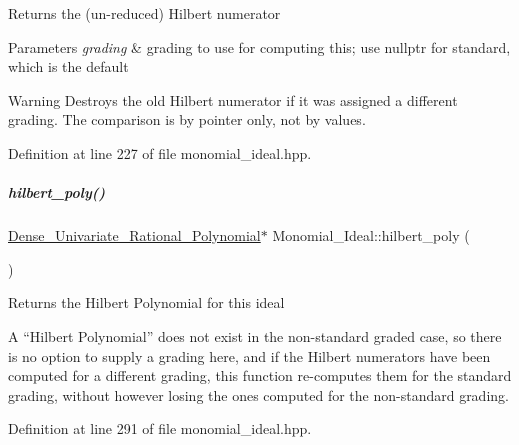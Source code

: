 \begin{DoxyReturn}{Returns}
the (un-\/reduced) Hilbert numerator 
\end{DoxyReturn}

\begin{DoxyParams}{Parameters}
{\em grading} & grading to use for computing this; use {\ttfamily nullptr} for standard, which is the default \\
\hline
\end{DoxyParams}
\begin{DoxyWarning}{Warning}
Destroys the old Hilbert numerator if it was assigned a different grading. The comparison is by pointer only, not by values. 
\end{DoxyWarning}


Definition at line 227 of file monomial\+\_\+ideal.\+hpp.

\mbox{\label{group__polygroup_a2f5e73c22e492ea016a4c7ff117cc7a3}} 
\subparagraph{\texorpdfstring{hilbert\+\_\+poly()}{hilbert\_poly()}}
{\footnotesize\ttfamily \hyperlink{group__polygroup_class_dense___univariate___rational___polynomial}{Dense\+\_\+\+Univariate\+\_\+\+Rational\+\_\+\+Polynomial}$\ast$ Monomial\+\_\+\+Ideal\+::hilbert\+\_\+poly (\begin{DoxyParamCaption}{ }\end{DoxyParamCaption})\hspace{0.3cm}{\ttfamily [inline]}}

\begin{DoxyReturn}{Returns}
the Hilbert Polynomial for this ideal
\end{DoxyReturn}
A ``Hilbert Polynomial'' does not exist in the non-\/standard graded case, so there is no option to supply a grading here, and if the Hilbert numerators have been computed for a different grading, this function re-\/computes them for the standard grading, without however losing the ones computed for the non-\/standard grading. 

Definition at line 291 of file monomial\+\_\+ideal.\+hpp.

